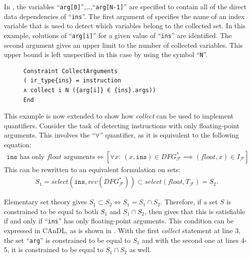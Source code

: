     \noindent
    In , the variables ``\texttt{arg[0]}'',\dots,``\texttt{arg[N-1]}''
    are specified to contain all of the direct data dependencies of
    ``\texttt{ins}''.
    The first argument of  specifies the name of an index
    variable that is used to detect which variables belong to the collected set.
    In this example, solutions of ``\texttt{arg[i]}'' for a given value
    of ``\texttt{ins}'' are identified.
    The second argument gives an upper limit to the number of collected
    variables.
    This upper bound is left unspecified in this case by using the symbol
    ``\texttt{N}''.

\begin{figure}[t]
\begin{lstlisting}[language=CAnDL,label={fig:simplecollect},caption=
   {Simple {\it collect} example in CAnDL: Direct data dependencies of
    ``{\tt ins}'' are collected.\leftskip=0pt\rightskip=0pt}]
Constraint CollectArguments
( ir_type{ins} = instruction
∧ collect i N ({arg[i]} ∈ {ins}.args))
End
\end{lstlisting}
\end{figure}

    This example is now extended to show how {\it collect} can be used to
    implement quantifiers.
    Consider the task of detecting instructions with only floating-point
    arguments.
    This involves the ``$\forall$'' quantifier, as it is equivalent to
    the following equation:
    \begin{align}
        \texttt{ins}\text{ has only }\textit{float}\text{ arguments}\iff
        \left[\forall x\colon\ (x,\texttt{ins})\in DFG_\mathcal F^*\implies(\textit{float},x)\in I_\mathcal F\right]
        \label{fig:implication}
    \end{align}
    This can be rewritten to an equivalent formulation on sets:
    \begin{align*}
        S_1= select(\texttt{ins},rev(DFG_\mathcal F^*))\subset select(\textit{float},T_\mathcal F)= S_2.
    \end{align*}
    
    Elementary set theory gives  $S_1\subset S_2\iff S_1 = S_1\cap S_2$.
    Therefore, if a set $S$ is constrained to be equal to both $S_1$ and
    $S_1\cap S_2$, then  gives that this is satisfiable if
    and only if ``{\tt ins}'' has only floating-point arguments.
    This condition can be expressed in CAnDL, as is shown in
    .
    With the first {\it collect} statement at line 3, the set ``\texttt{arg}''
    is constrained to be equal to $S_1$ and with the second one at lines 4-5, it
    is constrained to be equal to $S_1\cap S_2$ as well.

